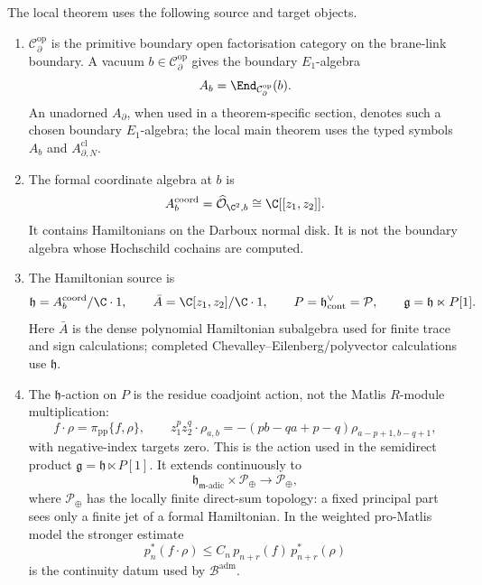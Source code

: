 \begin{defn}
\label{defn:typed-local-source-target-dictionary}
The local theorem uses the following source and target objects.
\begin{enumerate}[label=\textup{(\roman*)}]
  \item \(\mathcal C^{\mathrm{op}}_\partial\) is the primitive boundary
    open factorisation category on the brane-link boundary.  A vacuum
    \(b\in\mathcal C^{\mathrm{op}}_\partial\) gives the boundary
    \(E_1\)-algebra
    \[
      A_b=\End_{\mathcal C^{\mathrm{op}}_\partial}(b).
    \]
    An unadorned \(A_\partial\), when used in a theorem-specific
    section, denotes such a chosen boundary \(E_1\)-algebra; the local
    main theorem uses the typed symbols \(A_b\) and
    \(A^{\mathrm{cl}}_{\partial,N}\).
  \item The formal coordinate algebra at \(b\) is
    \[
      A_b^{\mathrm{coord}}
      =
      \widehat{\mathcal O}_{\C^2,b}
      \cong \C[[z_1,z_2]].
    \]
    It contains Hamiltonians on the Darboux normal disk.  It is not the
    boundary algebra whose Hochschild cochains are computed.
  \item The Hamiltonian source is
    \[
      \mathfrak h=A_b^{\mathrm{coord}}/\C\cdot1,\qquad
      \bar A=\C[z_1,z_2]/\C\cdot1,\qquad
      P=\mathfrak h^\vee_{\mathrm{cont}}=\mathcal P,\qquad
      \mathfrak g=\mathfrak h\ltimes P[1].
    \]
    Here \(\bar A\) is the dense polynomial Hamiltonian subalgebra used
    for finite trace and sign calculations; completed
    Chevalley--Eilenberg/polyvector calculations use \(\mathfrak h\).
  \item The \(\mathfrak h\)-action on \(P\) is the residue coadjoint
    action, not the Matlis \(R\)-module multiplication:
    \[
      f\cdot\rho=\pi_{\mathrm{pp}}\{f,\rho\},\qquad
      z_1^p z_2^q\cdot\rho_{a,b}
      =-(pb-qa+p-q)\rho_{a-p+1,b-q+1},
    \]
    with negative-index targets zero.  This is the action used in the
    semidirect product \(\mathfrak g=\mathfrak h\ltimes P[1]\).  It
    extends continuously to
    \[
      \mathfrak h_{\mathfrak m\text{-adic}}\times
      \mathcal P_{\oplus}\longrightarrow\mathcal P_{\oplus},
    \]
    where \(\mathcal P_{\oplus}\) has the locally finite direct-sum
    topology: a fixed principal part sees only a finite jet of a formal
    Hamiltonian.  In the weighted pro-Matlis model the stronger
    estimate
    \[
      p^*_n(f\cdot\rho)\leq C_n\,p_{n+r}(f)\,p^*_{n+r}(\rho)
    \]
    is the continuity datum used by \(\mathcal B^{\mathrm{adm}}\).

\end{enumerate}
\end{defn}
